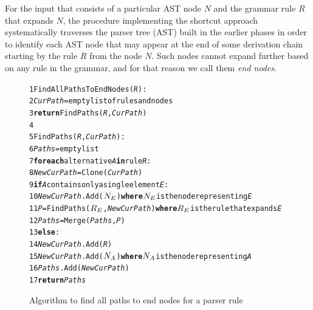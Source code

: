 For the input that consists of a particular AST node $N$ and the grammar rule $R$ that expands $N$, the procedure implementing the shortcut approach systematically traverses the parser tree (AST) built in the earlier phases in order to identify each AST node that may appear at the end of some derivation chain starting by the rule $R$ from the node $N$.
Such nodes cannot expand further based on any rule in the grammar, and for that reason we call them \emph{end nodes}.

\begin{figure}[ht]
\begin{framed}
\begin{alltt}
\small
 1 FindAllPathsToEndNodes(\textit{R}):
 2   \textit{CurPath} = empty list of rules and nodes
 3   \textbf{return} FindPaths(\textit{R}, \textit{CurPath})
 4
 5 FindPaths(\textit{R}, \textit{CurPath}):
 6  \textit{Paths} = empty list
 7  \textbf{for each} alternative \textit{A} \textbf{in} rule \textit{R}:
 8    \textit{NewCurPath} = Clone(\textit{CurPath})
 9    \textbf{if} \textit{A} contains only a single element \textit{E}:
10      \textit{NewCurPath}.Add(\(N\sb{E}\)) \textbf{where} \(N\sb{E}\) is the node representing \textit{E}
11      \textit{P} = FindPaths(\(R\sb{E}\), \textit{NewCurPath}) \textbf{where} \(R\sb{E}\) is the rule that expands \textit{E}
12      \textit{Paths} = Merge(\textit{Paths}, \textit{P})
13    \textbf{else}:
14      \textit{NewCurPath}.Add(\textit{R})
15      \textit{NewCurPath}.Add(\(N\sb{A}\)) \textbf{where} \(N\sb{A}\) is the node representing \textit{A}
16      \textit{Paths}.Add(\textit{NewCurPath})
17  \textbf{return} \textit{Paths}
\end{alltt}
\end{framed}
\caption{Algorithm to find all paths to end nodes for a parser rule}
\label{fig:SHORTCUTALG}
\end{figure}

